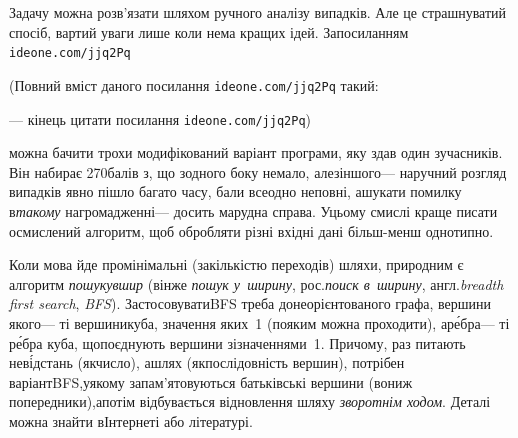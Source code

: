 \documentclass[14pt,a4paper]{extarticle}
\renewcommand{\baselinestretch}{1.3125}
\begin{document}
	

\Tutorial	Задачу можна розв'язати шляхом ручного аналізу випадків. Але це страшнуватий спосіб, вартий уваги лише коли нема кращих ідей. За\nolinebreak[2] посиланням 
\verb"ideone.com/jjq2Pq"


{\color{green}\begin{small}

\renewcommand{\baselinestretch}{0.875}

(Повний вміст даного посилання \verb"ideone.com/jjq2Pq" такий:

--- кінець цитати посилання \verb"ideone.com/jjq2Pq")

\end{small}}


 можна бачити трохи модифікований варіант програми, яку здав один з\nolinebreak[3] учасників. Він набирає 270\nolinebreak[3] балів з, що з\nolinebreak[3] одного боку немало, але\nolinebreak[2] з\nolinebreak[2] іншого\nolinebreak[3] --- на\nolinebreak[3] ручний розгляд випадків явно пішло багато часу, бали все\nolinebreak[2] одно не\nolinebreak[3] повні, а\nolinebreak[3] шукати помилку в\nolinebreak[3] \emph{такому} нагромадженні\nolinebreak[3] --- досить марудна справа. У\nolinebreak[3] цьому смислі краще писати осмислений алгоритм, щоб обробляти різні вхідні дані більш-менш однотипно.

{


Коли мова йде про\nolinebreak[3] мінімальні (за\nolinebreak[3] кількістю переходів) шляхи, природним є алгоритм \emph{пошуку\nolinebreak[3] вшир} (він\nolinebreak[3] же \emph{пошук у~ширину}, рос.\nolinebreak[3] \emph{поиск в~ширину}, англ.\nolinebreak[3] \emph{breadth first search}, \emph{BFS}). Застосовувати\nolinebreak[2] BFS треба до\nolinebreak[3] неорієн\-то\-ваного графа, вершини якого\nolinebreak[3] --- ті вершини\nolinebreak[1] куба, значення яких~1 (по\nolinebreak[3] яким можна проходити), а\nolinebreak[3] р\'{е}бра\nolinebreak[3] --- ті р\'{е}бра куба, що\nolinebreak[3] поєднують вершини зі\nolinebreak[3] значеннями~1. Причому, раз питають не\nolinebreak[3] в\'{і}д\-стань (як\nolinebreak[3] число), а\nolinebreak[3] шлях (як\nolinebreak[3] послідовність вершин), потрібен варіант\nolinebreak[2] BFS,\linebreak[1] у\nolinebreak[3] якому запам'ятовуються батьківські вершини (вони\nolinebreak[3] ж попередники),\linebreak[1] а\nolinebreak[3] потім відбувається відновлення шляху \emph{зворотнім ходом}. Деталі можна знайти в\nolinebreak[3] Інтернеті або літературі.

}
\end{document}

